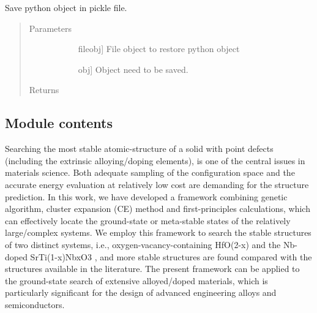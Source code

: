 \documentclass[letterpaper,10pt,english]{sphinxmanual}
\begin{document}

\begin{fulllineitems}
\label{\detokenize{pygace:pygace.utility.save_to_pickle}}
Save python object in pickle file.
\begin{quote}\begin{description}
\item[{Parameters}] \leavevmode\begin{description}
\item[{}] \leavevmode{[}fileobj{]}
File object to restore python object

\item[{}] \leavevmode{[}obj{]}
Object need to be saved.

\end{description}

\item[{Returns}] \leavevmode\begin{description}
\item[{}] \leavevmode
\end{description}

\end{description}\end{quote}

\end{fulllineitems}



\subsection{Module contents}
\label{\detokenize{pygace:module-pygace}}\label{\detokenize{pygace:module-contents}}
Searching the most stable atomic-structure of a solid with point defects
(including the extrinsic alloying/doping elements), is one of the central issues in
materials science. Both adequate sampling of the configuration space and the
accurate energy evaluation at relatively low cost are demanding for the structure
prediction. In this work, we have developed a framework combining genetic
algorithm, cluster expansion (CE) method and first-principles calculations, which
can effectively locate the ground-state or meta-stable states of the relatively
large/complex systems. We employ this framework to search the stable structures
of two distinct systems, i.e., oxygen-vacancy-containing HfO(2-x) and the
Nb-doped SrTi(1-x)NbxO3 , and more stable structures are found compared with
the structures available in the literature. The present framework can be applied
to the ground-state search of extensive alloyed/doped materials, which is
particularly significant for the design of advanced engineering alloys and
semiconductors.
\end{document}
